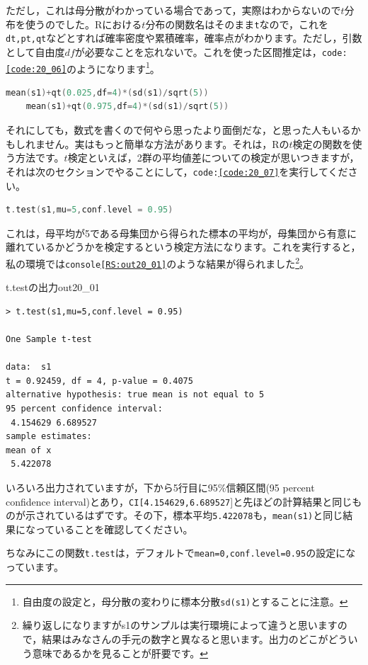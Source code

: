 \documentclass{ltjsbook}
\begin{document}
ただし，これは母分散がわかっている場合であって，実際はわからないので$t$分布を使うのでした。Rにおける$t$分布の関数名はそのまま\texttt{t}なので，これを\texttt{dt,pt,qt}などとすれば確率密度や累積確率，確率点がわかります。ただし，引数として自由度$df$が必要なことを忘れないで。これを使った区間推定は，\texttt{code:\ref{code:20_06}}のようになります\footnote{自由度の設定と，母分散の変わりに標本分散\texttt{sd(s1)}とすることに注意。}。
\begin{lstlisting}[language=c++,label={code:20_06},caption={母分散がわからない場合}]
    mean(s1)+qt(0.025,df=4)*(sd(s1)/sqrt(5))
    mean(s1)+qt(0.975,df=4)*(sd(s1)/sqrt(5))
\end{lstlisting}
それにしても，数式を書くので何やら思ったより面倒だな，と思った人もいるかもしれません。実はもっと簡単な方法があります。それは，Rの$t$検定の関数を使う方法です。$t$検定といえば，2群の平均値差についての検定が思いつきますが，それは次のセクションでやることにして，\texttt{code:\ref{code:20_07}}を実行してください。
\begin{lstlisting}[language=c++,label={code:20_07},caption={t.test関数で推定}]
    t.test(s1,mu=5,conf.level = 0.95)
\end{lstlisting}
これは，母平均が5である母集団から得られた標本の平均が，母集団から有意に離れているかどうかを検定するという検定方法になります。これを実行すると，私の環境では\texttt{console\ref{RS:out20_01}}のような結果が得られました\footnote{繰り返しになりますがs1のサンプルは実行環境によって違うと思いますので，結果はみなさんの手元の数字と異なると思います。出力のどこがどういう意味であるかを見ることが肝要です。}。

\begin{Rscreen}{t.testの出力}{out20_01}
	\begin{verbatim}
> t.test(s1,mu=5,conf.level = 0.95)

One Sample t-test

data:  s1
t = 0.92459, df = 4, p-value = 0.4075
alternative hypothesis: true mean is not equal to 5
95 percent confidence interval:
 4.154629 6.689527
sample estimates:
mean of x 
 5.422078
\end{verbatim}
\end{Rscreen}
いろいろ出力されていますが，下から5行目に95\%信頼区間(95 percent confidence interval)とあり，\texttt{CI[4.154629,6.689527}]と先ほどの計算結果と同じものが示されているはずです。その下，標本平均\texttt{5.422078}も，\texttt{mean(s1)}と同じ結果になっていることを確認してください。

ちなみにこの関数\texttt{t.test}は，デフォルトで\texttt{mean=0,conf.level=0.95}の設定になっています。
\end{document}
